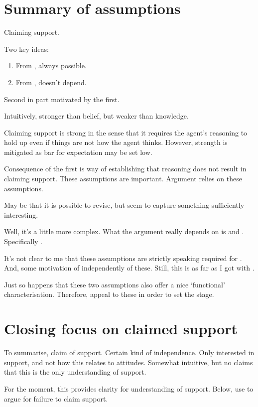 \section{Summary of assumptions}

\begin{note}
  Claiming support.

  Two key ideas:

  \begin{enumerate}
  \item From \nfcs{}, always possible.
  \item From \eiS{}, doesn't depend.
  \end{enumerate}
  Second in part motivated by the first.

  Intuitively, stronger than belief, but weaker than knowledge.

  {
    \color{red}
    Claiming support is strong in the sense that it requires the agent's reasoning to hold up even if things are not how the agent thinks.
    However, strength is mitigated as bar for expectation may be set low.
  }

  Consequence of the first is way of establishing that reasoning does not result in claiming support.
  These assumptions are important.
  Argument relies on these assumptions.

  May be that it is possible to revise, but seem to capture something sufficiently interesting.
\end{note}

\begin{note}
  Well, it's a little more complex.
  What the argument really depends on is \ESU{} and \nI{}.
  Specifically \nI{}.

  It's not clear to me that these assumptions are strictly speaking required for \nI{}.
  And, some motivation of \nI{} independently of these.
  Still, this is as far as I got with \nI{}.

  Just so happens that these two assumptions also offer a nice `functional' characterisation.
  Therefore, appeal to these in order to set the stage.
\end{note}

\section{Closing focus on claimed support}

\begin{note}
  To summarise, claim of support.
  Certain kind of independence.
  Only interested in support, and not how this relates to attitudes.
  Somewhat intuitive, but no claims that this is the only understanding of support.

  For the moment, this provides clarity for understanding of support.
  Below, use to argue for failure to claim support.
\end{note}


